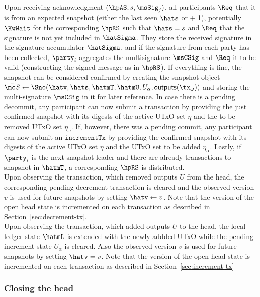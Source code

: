 \quad Upon receiving acknowledgment $(\hpAS,s,\msSig_j)$, all
participants $\Req$ that it is from an expected snapshot (either the last seen
$\hats$ or + 1), potentially $\KwWait$ for the corresponding $\hpRS$ such that
$\hats = s$ and $\Req$ that the signature is not yet included in $\hatSigma$.
They store the received signature in the signature accumulator $\hatSigma$, and
if the signature from each party has been collected, $\party_i$ aggregates the
multisignature $\msCSig$ and $\Req$ it to be valid (constructing the signed
message as in $\hpRS$). If everything is fine, the snapshot can be considered
confirmed by creating the snapshot object
$\bar{\mc S} \gets \Sno(\hatv, \hats, \hatmT, \hatmU, U_{\alpha}, \mathsf{outputs}(\tx_{\omega}))$
and storing the multi-signature $\msCSig$ in it for later reference. In case
there is a pending decommit, any participant can now submit a \mtxDecrement{}
transaction by providing the just confirmed snapshot with its digests of the
active UTxO set $\eta$ and the to be removed UTxO set $\eta_{\omega}$. If, however, there
was a pending commit, any participant can now submit an $\mathtt{incrementTx}$
by providing the confirmed snapshot with its digests of the active UTxO set $\eta$
and the UTxO set to be added $\eta_\alpha$. Lastly, if $\party_i$ is the next snapshot
leader and there are already transactions to snapshot in $\hatmT$, a
corresponding $\hpRS$ is distributed. \\

\quad Upon observing the \mtxDecrement{}
transaction, which removed outputs $U$ from the head, the corresponding pending
decrement transaction is cleared and the observed version $v$ is used for future
snapshots by setting $\hatv \gets v$. Note that the version of the open head state
is incremented on each \mtxDecrement{} transaction as described in
Section~\ref{sec:decrement-tx}. \\

\quad Upon observing the \mtxIncrement{}
  transaction, which added outputs $U$ to the head, the local ledger state
  $\hatmL$ is extended with the newly addded UTxO while the pending increment
  state $U_{\alpha}$ is cleared. Also the observed version $v$ is used for future
  snapshots by setting $\hatv = v$. Note that the version of the open head state
  is incremented on each \mtxIncrement{} transaction as described in
  Section~\ref{sec:increment-tx}

\subsubsection{Closing the head}

